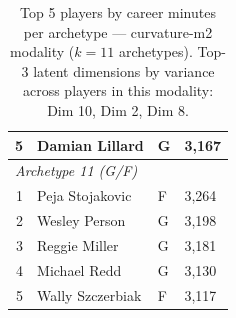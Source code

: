 \begin{table}[htbp]
\begin{tabular}{rlll}
    5 & Damian Lillard & G & 3,167 \\
    \midrule[0.4pt]
    \multicolumn{4}{l}{\textit{Archetype 11 (G/F)}} \\
    \midrule
    1 & Peja Stojakovic & F & 3,264 \\
    2 & Wesley Person & G & 3,198 \\
    3 & Reggie Miller & G & 3,181 \\
    4 & Michael Redd & G & 3,130 \\
    5 & Wally Szczerbiak & F & 3,117 \\
    \bottomrule
  \end{tabular}
  \caption{Top 5 players by career minutes per archetype --- curvature-m2 modality ($k=11$ archetypes). Top-3 latent dimensions by variance across players in this modality: Dim 10, Dim 2, Dim 8.}
  \label{tab:arch_reps_curvature_m2}
\end{table}

